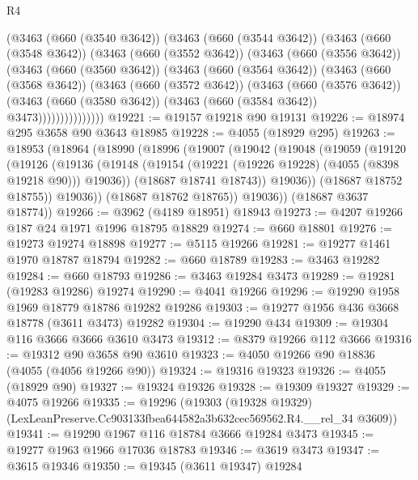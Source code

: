 \begin{lexlean}{R4}
\begin{coremodule}
          (@3463
            (@660 (@3540 @3642))
            (@3463
              (@660 (@3544 @3642))
              (@3463
                (@660 (@3548 @3642))
                (@3463
                  (@660 (@3552 @3642))
                  (@3463
                    (@660 (@3556 @3642))
                    (@3463
                      (@660 (@3560 @3642))
                      (@3463
                        (@660 (@3564 @3642))
                        (@3463
                          (@660 (@3568 @3642))
                          (@3463
                            (@660 (@3572 @3642))
                            (@3463
                              (@660 (@3576 @3642))
                              (@3463
                                (@660 (@3580 @3642))
                                (@3463 (@660 (@3584 @3642)) @3473)))))))))))))))
@19221 := @19157 @19218 @90 @19131
@19226 := @18974 @295 @3658 @90 @3643 @18985
@19228 := @4055 (@18929 @295)
@19263 := @18953
    (@18964
      (@18990
        (@18996
          (@19007
            (@19042
              (@19048
                (@19059
                  (@19120
                    (@19126
                      (@19136
                        (@19148 (@19154 (@19221 (@19226 @19228) (@4055 (@8398 @19218 @90))) @19036))
                        (@18687 @18741 @18743))
                      @19036))
                  (@18687 @18752 @18755))
                @19036))
            (@18687 @18762 @18765))
          @19036))
      (@18687 @3637 @18774))
@19266 := @3962 (@4189 @18951) @18943
@19273 := @4207 @19266 @187 @24 @1971 @1996 @18795 @18829
@19274 := @660 @18801
@19276 := @19273 @19274 @18898
@19277 := @5115 @19266
@19281 := @19277 @1461 @1970 @18787 @18794
@19282 := @660 @18789
@19283 := @3463 @19282
@19284 := @660 @18793
@19286 := @3463 @19284 @3473
@19289 := @19281 (@19283 @19286) @19274
@19290 := @4041 @19266
@19296 := @19290 @1958 @1969 @18779 @18786 @19282 @19286
@19303 := @19277 @1956 @436 @3668 @18778 (@3611 @3473) @19282
@19304 := @19290 @434
@19309 := @19304 @116 @3666 @3666 @3610 @3473
@19312 := @8379 @19266 @112 @3666
@19316 := @19312 @90 @3658 @90 @3610
@19323 := @4050 @19266 @90 @18836 (@4055 (@4056 @19266 @90))
@19324 := @19316 @19323
@19326 := @4055 (@18929 @90)
@19327 := @19324 @19326
@19328 := @19309 @19327
@19329 := @4075 @19266
@19335 := @19296
    (@19303 (@19328 @19329) (LexLeanPreserve.Cc903133fbea644582a3b632cec569562.R4.__rel_34 @3609))
@19341 := @19290 @1967 @116 @18784 @3666 @19284 @3473
@19345 := @19277 @1963 @1966 @17036 @18783
@19346 := @3619 @3473
@19347 := @3615 @19346
@19350 := @19345 (@3611 @19347) @19284

\end{coremodule}
\end{lexlean}
